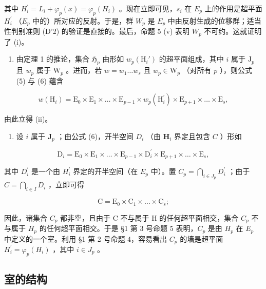 其中 \(H_{i}^{\prime}=L_{i}+\varphi_{p}(x)=\varphi_{p}(H_{i})\) 。现在立即可见，\(s_{i}\) 在 \(E_{p}\) 上的作用是超平面 \(H_{i}^{\prime}\) （\(E_{p}\) 中的）所对应的反射。于是，群 \(W_{p}\) 是 \(E_{p}\) 中由反射生成的位移群；适当性判别准则 (D'2) 的验证是直接的。最后，命题 5 (v) 表明 \(W_{p}\) 不可约。这就证明了 (i)。

\begin{enumerate}
\def\labelenumi{(\roman{enumi})}
\setcounter{enumi}{1}
\tightlist
\item
  由定理 1 的推论，集合 \(\mathfrak{H}_p\) 由形如 \(w_p(\mathrm{H}_i')\) 的超平面组成，其中 \(i\) 属于 \(\mathrm{J}_p\) 且 \(w_p\) 属于 \(\mathrm{W}_p\) 。进而，若 \(w = w_1 \ldots w_s\) 且 \(w_p \in \mathrm{W}_p\) （对所有 \(p\) ），则公式 (5) 与 (6) 蕴含
\end{enumerate}

\[
w (\mathrm{H} _ {i}) = \mathrm{E} _ {0} \times \mathrm{E} _ {1} \times \dots \times \mathrm{E} _ {p - 1} \times w _ {p} (\mathrm{H} _ {i} ^ {\prime}) \times \mathrm{E} _ {p + 1} \times \dots \times \mathrm{E} _ {s},\tag{7}
\]

由此立得 (ii)。

\begin{enumerate}
\def\labelenumi{(\roman{enumi})}
\setcounter{enumi}{2}
\tightlist
\item
  设 \(i\) 属于 \(\mathbf{J}_p\) ；由公式 (6)，开半空间 \(D_i\) （由 \(\mathbf{H}_i\) 界定且包含 \(C\) ）形如
\end{enumerate}

\[
\mathrm{D} _ {i} = \mathrm{E} _ {0} \times \mathrm{E} _ {1} \times \dots \times \mathrm{E} _ {p - 1} \times \mathrm{D} _ {i} ^ {\prime} \times \mathrm{E} _ {p + 1} \times \dots \times \mathrm{E} _ {s},
\]

其中 \(D_{i}^{\prime}\) 是一个由 \(H_{i}^{\prime}\) 界定的开半空间（在 \(E_{p}\) 中）。置 \(C_{p} = \bigcap_{i \in J_{p}} D_{i}^{\prime}\) ；由于 \(C = \bigcap_{i \in I} D_{i}\) ，立即可得

\[
\mathrm{C} = \mathrm{E} _ {0} \times \mathrm{C} _ {1} \times \dots \times \mathrm{C} _ {s};
\]

因此，诸集合 \(C_{p}\) 都非空，且由于 C 不与属于 H 的任何超平面相交，集合 \(C_{p}\) 不与属于 \(H_{p}\) 的任何超平面相交。于是 §1 第 3 号命题 5 表明，\(C_{p}\) 是由 \(H_{p}\) 在 \(E_{p}\) 中定义的一个室。利用 §1 第 2 号命题 4，容易看出 \(C_{p}\) 的墙是超平面 \(H_{i}^{\prime} = \varphi_{p}(H_{i})\) ，其中 \(i \in J_{p}\) 。

\subsection{室的结构}

